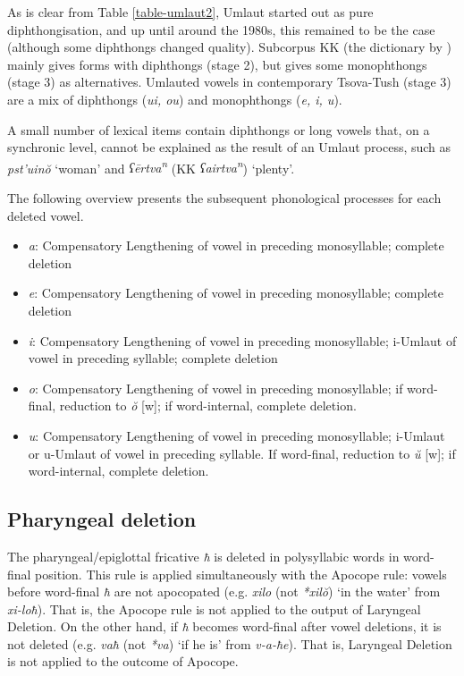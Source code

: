 As is clear from Table \ref{table-umlaut2}, Umlaut started out as pure diphthongisation, and up until around the 1980s, this remained to be the case (although some diphthongs changed quality). Subcorpus KK (the dictionary by \cites[]{kadkad84}) mainly gives forms with diphthongs (stage 2), but gives some monophthongs (stage 3) as alternatives. Umlauted vowels in contemporary Tsova-Tush (stage 3) are a mix of diphthongs (\textit{ui, ou}) and monophthongs (\textit{e, i, u}). 


A small number of lexical items contain diphthongs or long vowels that, on a synchronic level, cannot be explained as the result of an Umlaut process, such as \textit{pst'uin\u{o}} `woman' and  \textit{ʕ\={e}rtva\textsuperscript{n}} (KK \textit{ʕairtva\textsuperscript{n}}) `plenty'.

The following overview presents the subsequent phonological processes for each deleted vowel.

\begin{itemize}
	\item \textit{a}: Compensatory Lengthening of vowel in preceding monosyllable; complete deletion
	\item \textit{e}: Compensatory Lengthening of vowel in preceding monosyllable; complete deletion
	\item \textit{i}: Compensatory Lengthening of vowel in preceding monosyllable; i-Umlaut of vowel in preceding syllable; complete deletion
	\item \textit{o}: Compensatory Lengthening of vowel in preceding monosyllable; if word-final, reduction to \textit{\u{o}} [w]; if word-internal, complete deletion.
	\item \textit{u}: Compensatory Lengthening of vowel in preceding monosyllable; i-Umlaut or u-Umlaut of vowel in preceding syllable. If word-final, reduction to \textit{\u{u}} [w]; if word-internal, complete deletion.
\end{itemize}



\subsection{Pharyngeal deletion}

The pharyngeal/epiglottal fricative \textit{ħ} is deleted in polysyllabic words in word-final position. This rule is applied simultaneously with the Apocope rule: vowels before word-final \textit{ħ} are not apocopated (e.g.  \textit{xilo} (not \textit{*xil\u{o}}) `in the water' from \textit{xi-loħ}). That is, the Apocope rule is not applied to the output of Laryngeal Deletion. On the other hand, if \textit{ħ} becomes word-final after vowel deletions, it is not deleted (e.g.  \textit{vaħ} (not \textit{*va}) `if he is' from \textit{v-a-ħe}). That is, Laryngeal Deletion is not applied to the outcome of Apocope.


